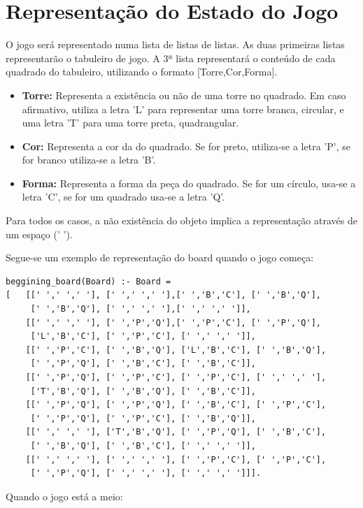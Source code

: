 \documentclass[a4paper]{article}
\begin{document}
\section{Representação do Estado do Jogo}

O jogo será representado numa lista de listas de listas. As duas primeiras listas representarão o tabuleiro de jogo. A 3ª lista representará o conteúdo de cada quadrado do tabuleiro, utilizando o formato [Torre,Cor,Forma].

\begin{itemize}
\item \textbf{Torre:} Representa a existência ou não de uma torre no quadrado. Em caso afirmativo, utiliza a letra 'L' para representar uma torre branca, circular, e uma letra 'T' para uma torre preta, quadrangular.
\item \textbf{Cor:} Representa a cor da do quadrado. Se for preto, utiliza-se a letra 'P', se for branco utiliza-se a letra 'B'.
\item \textbf{Forma:} Representa a forma da peça do quadrado. Se for um círculo, usa-se a letra 'C', se for um quadrado usa-se a letra 'Q'.
\end{itemize}

Para todos os casos, a não existência do objeto implica a representação através de um espaço (' ').

Segue-se um exemplo de representação do board quando o jogo começa:

\begin{lstlisting}
beggining_board(Board) :- Board =
[	[[' ',' ',' '], [' ',' ',' '],[' ','B','C'], [' ','B','Q'],
	 [' ','B','Q'], [' ',' ',' '],[' ',' ',' ']],
	[[' ',' ',' '], [' ','P','Q'],[' ','P','C'], [' ','P','Q'],
 	 ['L','B','C'], [' ','P','C'], [' ',' ',' ']],
	[[' ','P','C'], [' ','B','Q'], ['L','B','C'], [' ','B','Q'],
	 [' ','P','Q'], [' ','B','C'], [' ','B','C']],
	[[' ','P','Q'], [' ','P','C'], [' ','P','C'], [' ',' ',' '],
	 ['T','B','Q'], [' ','B','Q'], [' ','B','C']],
 	[[' ','P','Q'], [' ','P','Q'], [' ','B','C'], [' ','P','C'],
 	 [' ','P','Q'], [' ','P','C'], [' ','B','Q']],
 	[[' ',' ',' '], ['T','B','Q'], [' ','P','Q'], [' ','B','C'],
 	 [' ','B','Q'], [' ','B','C'], [' ',' ',' ']],
 	[[' ',' ',' '], [' ',' ',' '], [' ','P','C'], [' ','P','C'],
 	 [' ','P','Q'], [' ',' ',' '], [' ',' ',' ']]].
\end{lstlisting}

Quando o jogo está a meio:
\end{document}
